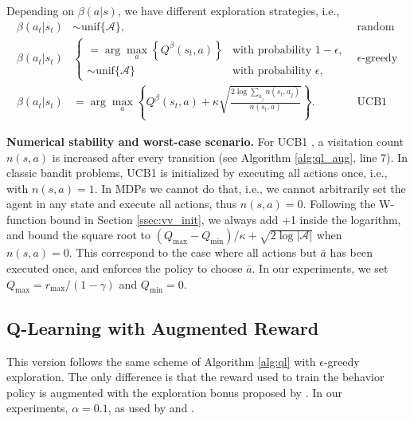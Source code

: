 \documentclass{article}
\newcommand{\actionspace}{\mathcal A}
\newcommand{\coeff}{\kappa}
\begin{document}
Depending on $\beta(a|s)$, we have different exploration strategies, i.e.,
\begin{align}
	\beta(a_t|s_t)  &\sim \text{unif}\{\actionspace\}, & \text{random}
	\\
	\beta(a_t|s_t) & \begin{cases} 
	    = \arg\max_a \left\lbrace Q^\beta(s_t,a) \right\rbrace & \text{with probability $1\!-\!\epsilon$}, 
		\\
		\sim \text{unif}\{\actionspace\} & \text{with probability $\epsilon$},
		\end{cases} & \text{$\epsilon$-greedy}
	\\
	\beta(a_t|s_t) &= \arg\max_a \left\lbrace Q^\beta(s_t,a) + \coeff \sqrt{\frac{2\log \sum_{a_j} n(s_t,a_j)}{n(s_t,a)}} \right\rbrace. & \text{UCB1}
\end{align}

\textbf{Numerical stability and worst-case scenario.} For UCB1 \citep{auer2002finite}, a visitation count $n(s,a)$ is increased after every transition (see Algorithm \ref{alg:ql_aug}, line 7). In classic bandit problems, UCB1 is initialized by executing all actions once, i.e., with $n(s,a) = 1$. In MDPs we cannot do that, i.e., we cannot arbitrarily set the agent in any state and execute all actions, thus $n(s,a) = 0$. Following the W-function bound in Section \ref{ssec:vv_init}, we always add +1 inside the logarithm, and bound the square root to $(Q_{\max} - Q_{\min}) / \coeff + \sqrt{2\log|\actionspace|}$ when $n(s,a) = 0$. This correspond to the case where all actions but $\bar{a}$ has been executed once, and enforces the policy to choose $\bar{a}$. In our experiments, we set $Q_{\max} = r_{\max} / (1 - \gamma)$ and $Q_{\min} = 0$.


\subsection{Q-Learning with Augmented Reward}
This version follows the same scheme of Algorithm \ref{alg:ql} with $\epsilon$-greedy exploration. The only difference is that the reward used to train the behavior policy is augmented with the exploration bonus proposed by \citet{strehl2008analysis}. 
In our experiments, $\alpha = 0.1$, as used by \citet{strehl2008analysis} and \citet{bellemare2016unifying}.
\end{document}

